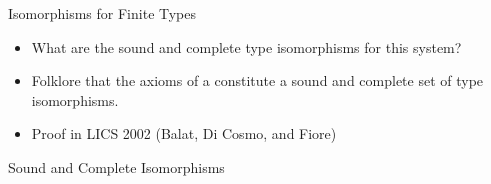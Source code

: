\documentclass[11pt]{beamer}
\newcommand{\red}[1]{{\color{red}{#1}}}
\begin{document}
\begin{frame}{Isomorphisms for Finite Types}

\begin{itemize}

  \vfill\item What are the sound and complete type isomorphisms for
  this system? 

  \vfill\item Folklore that the axioms of a \red{commutative semiring}
  constitute a sound and complete set of type isomorphisms. 

  \vfill\item Proof in LICS 2002 (Balat, Di Cosmo, and Fiore) 

\end{itemize}

\vfill

\end{frame}

\begin{frame}{Sound and Complete Isomorphisms}

{\scriptsize
}
\pause

{\scriptsize
}
\pause

{\scriptsize
}

\pause

{\scriptsize
%
%
%
%
%
%
%
}
\end{frame}
\end{document}
